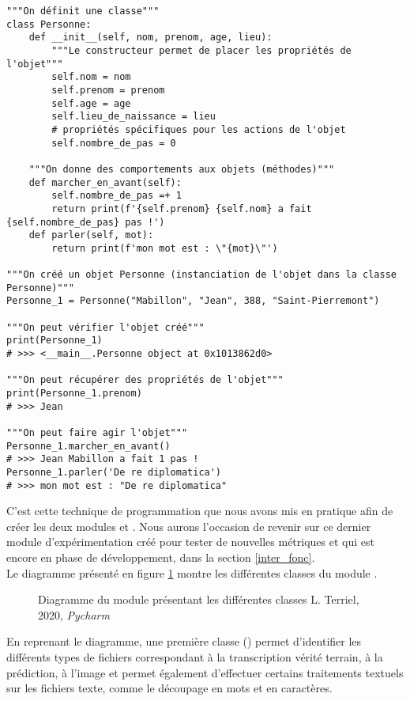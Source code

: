 \lstset{language=Python}
\begin{lstlisting}
"""On définit une classe"""
class Personne:
    def __init__(self, nom, prenom, age, lieu):
        """Le constructeur permet de placer les propriétés de l'objet"""
        self.nom = nom
        self.prenom = prenom
        self.age = age
        self.lieu_de_naissance = lieu
        # propriétés spécifiques pour les actions de l'objet
        self.nombre_de_pas = 0

    """On donne des comportements aux objets (méthodes)"""
    def marcher_en_avant(self):
        self.nombre_de_pas =+ 1
        return print(f'{self.prenom} {self.nom} a fait {self.nombre_de_pas} pas !')
    def parler(self, mot):
        return print(f'mon mot est : \"{mot}\"')

"""On créé un objet Personne (instanciation de l'objet dans la classe Personne)"""
Personne_1 = Personne("Mabillon", "Jean", 388, "Saint-Pierremont")

"""On peut vérifier l'objet créé"""
print(Personne_1)
# >>> <__main__.Personne object at 0x1013862d0>

"""On peut récupérer des propriétés de l'objet"""
print(Personne_1.prenom)
# >>> Jean

"""On peut faire agir l'objet"""
Personne_1.marcher_en_avant()
# >>> Jean Mabillon a fait 1 pas !
Personne_1.parler('De re diplomatica')
# >>> mon mot est : "De re diplomatica"
\end{lstlisting}

C'est cette technique de programmation que nous avons mis en pratique afin de créer les deux modules  et . Nous aurons l'occasion de revenir sur ce dernier module d'expérimentation créé pour tester de nouvelles métriques et qui est encore en phase de développement, dans la section \ref{inter_fonc}.\\

Le diagramme présenté en figure \ref{fig:diag_synsem} montre les différentes classes du module 
.

\begin{figure}[H]
    \centering
    \centerline{}
    \caption{Diagramme du module  présentant les différentes classes \textcopyright L. Terriel, 2020, \textit{Pycharm}}
    \label{fig:diag_synsem}
\end{figure}

En reprenant le diagramme, une première classe () permet d'identifier les différents types de fichiers correspondant à la transcription vérité terrain, à la prédiction, à l'image et permet également d'effectuer certains traitements textuels sur les fichiers texte, comme le découpage en mots et en caractères. 


